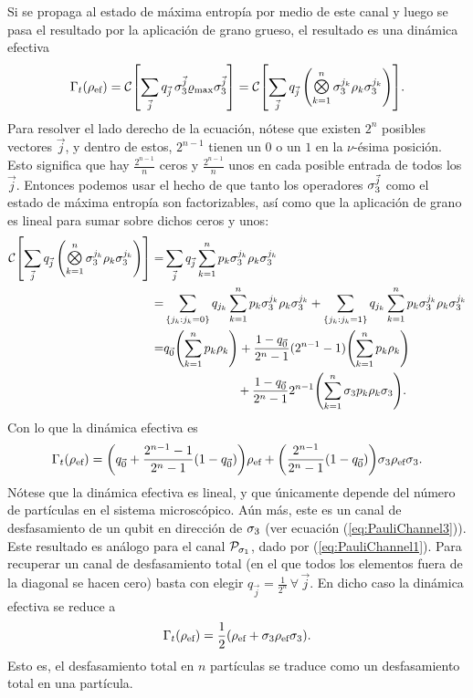 Si se propaga al estado de máxima entropía por medio de este canal y luego se pasa el resultado por la aplicación de grano grueso, el resultado es una dinámica efectiva
\begin{equation}
  \Gamma_{t}(\rho_{\ef})=\mcC\qty[\sum_{\vec{j}}q_{\vec{j}}\,\pauli{3}^{\vec{j}}\varrho_{\max}\pauli{3}^{\vec{j}}]=\mcC\qty[\sum_{\vec{j}}q_{\vec{j}}\,\qty(\Motimes_{k=1}^{n} \pauli{3}^{j_{k}}\rho_{k}\pauli{3}^{j_{k}})]\nonumber.\nonumber
\end{equation}
Para resolver el lado derecho de la ecuación, nótese que existen $2^{n}$ posibles vectores $\vec{j}$, y dentro de estos, $2^{n-1}$ tienen un $0$ o un $1$ en la $\nu$-ésima posición. Esto significa que hay $\frac{2^{n-1}}{n}$ ceros y $\frac{2^{n-1}}{n}$ unos en cada posible entrada de todos los $\vec{j}$. Entonces podemos usar el hecho de que tanto los operadores $\sigma_{3}^{\vec{j}}$ como el estado de máxima entropía son factorizables, así como que la aplicación de grano es lineal para sumar sobre dichos ceros y unos:
\begin{align}
    \mcC\qty[\sum_{\vec{j}}q_{\vec{j}}\,\qty(\Motimes_{k=1}^{n} \pauli{3}^{j_{k}}\rho_{k}\pauli{3}^{j_{k}})]=&\sum_{\vec{j}}q_{\vec{j}}\sum_{k=1}^{n}p_{k}\pauli{3}^{j_{k}}\rho_{k}\pauli{3}^{j_{k}}\nonumber\\
    =&\sum_{\{j_{k}:j_{k}=0\}}q_{j_{k}}\sum_{k=1}^{n}p_{k}\pauli{3}^{j_{k}}\rho_{k}\pauli{3}^{j_{k}}+\sum_{\{j_{k}:j_{k}=1\}}q_{j_{k}}\sum_{k=1}^{n}p_{k}\pauli{3}^{j_{k}}\rho_{k}\pauli{3}^{j_{k}}\nonumber\\
    =&q_{\vec{0}}\qty(\sum_{k=1}^{n}p_{k}\rho_{k})+\frac{1-q_{\vec{0}}}{2^{n}-1}(2^{n-1}-1)\qty(\sum_{k=1}^{n}p_{k}\rho_{k})\nonumber\\
    & \ \ \ \ \ \ \ \ \ \ \ \ \ \ \ \ \ \ +\frac{1-q_{\vec{0}}}{2^{n}-1}2^{n-1}\qty(\sum_{k=1}^{n}\pauli{3}p_{k}\rho_{k}\pauli{3}).\nonumber
\end{align}
Con lo que la dinámica efectiva es
\begin{equation}
    \Gamma_{t}(\rho_{\text{ef}})=\qty(q_{\vec{0}}+\frac{2^{n-1}-1}{2^{n}-1}(1-q_{\vec{0}}))\rho_{\text{ef}}+\qty(\frac{2^{n-1}}{2^{n}-1}(1-q_{\vec{0}}))\sigma_{3}\rho_{\text{ef}}\sigma_{3}.\nonumber
\end{equation}
Nótese que la dinámica efectiva es lineal, y que únicamente depende del número de partículas en el sistema microscópico. Aún más, este es un canal de desfasamiento de un qubit en dirección de $\sigma_{3}$ (ver ecuación (\ref{eq:PauliChannel3})). Este resultado es análogo para el canal $\mathcal{P}_{\sigma_{1}}$, dado por (\ref{eq:PauliChannel1}). Para recuperar un canal de desfasamiento total (en el que todos los elementos fuera de la diagonal se hacen cero) basta con elegir $q_{\vec{j}}=\frac{1}{2^{n}}\,\forall\,\vec{j}$. En dicho caso la dinámica efectiva se reduce a
\begin{equation}\label{eq:EffectiveDephasing}
    \Gamma_{t}(\rho_{\text{ef}})=\frac{1}{2}(\rho_{\text{ef}}+\sigma_{3}\rho_{\text{ef}}\sigma_{3}).
\end{equation}
Esto es, el desfasamiento total en $n$ partículas se traduce como un desfasamiento total en una partícula.



